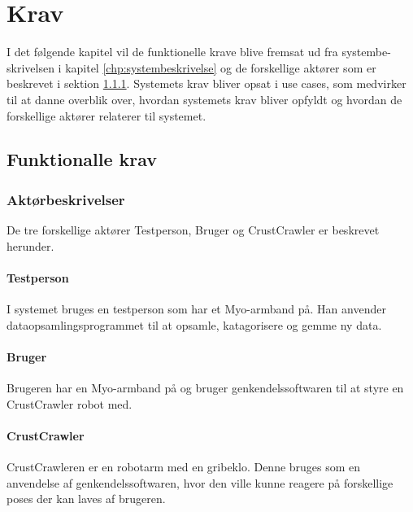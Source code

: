 \thispagestyle{fancy}
\chapter{Krav}
\label{chp:krav}
I det følgende kapitel vil de funktionelle krave blive fremsat ud fra systembe- skrivelsen i kapitel \ref{chp:systembeskrivelse} og de forskellige aktører som er beskrevet i sektion \ref{sec:aktorbeskrivelser}.
Systemets krav bliver opsat i use cases, som medvirker til at danne overblik over, hvordan systemets krav bliver opfyldt og hvordan de forskellige aktører relaterer til systemet.

\section{Funktionalle krav}
\label{sec:funktionellekrav}

\subsection{Aktørbeskrivelser}
\label{sec:aktorbeskrivelser}
De tre forskellige aktører Testperson, Bruger og CrustCrawler er beskrevet herunder.

\subsubsection{Testperson}
I systemet bruges en testperson som har et Myo-armband på. Han anvender dataopsamlingsprogrammet til at opsamle, katagorisere og gemme ny data.

\subsubsection{Bruger}
Brugeren har en Myo-armband på og bruger genkendelssoftwaren til at styre en CrustCrawler robot med.

\subsubsection{CrustCrawler}
CrustCrawleren er en robotarm med en gribeklo. Denne bruges som en anvendelse af genkendelssoftwaren, hvor den ville kunne reagere på forskellige poses der kan laves af brugeren.

